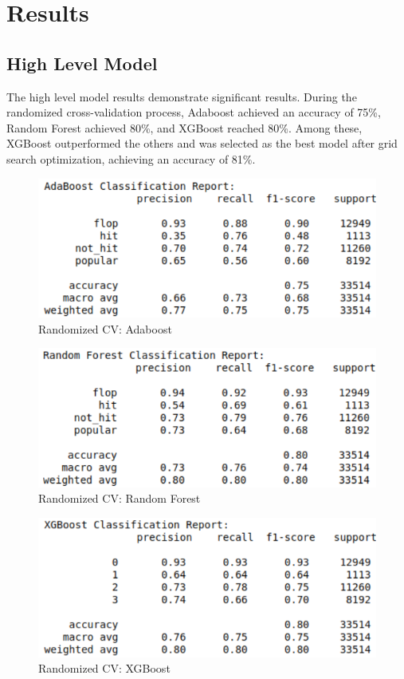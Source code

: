 \documentclass[11pt]{report}
\begin{document}

\chapter{Results}

\section{High Level Model}

The high level model results demonstrate significant results. During the randomized cross-validation process, Adaboost achieved an accuracy of 75\%, Random Forest achieved 80\%, and XGBoost reached 80\%. Among these, XGBoost outperformed the others and was selected as the best model after grid search optimization, achieving an accuracy of 81\%.

\begin{figure}[H]
    \centering
    \includegraphics[width=0.8\linewidth]{results/highlevel_ada_random.png}
    \caption{Randomized CV: Adaboost}
\end{figure}

\begin{figure}[H]
    \centering
    \includegraphics[width=0.8\linewidth]{results/highlevel_rf_random.png}
    \caption{Randomized CV: Random Forest}
\end{figure}

\begin{figure}[H]
    \centering
    \includegraphics[width=0.8\linewidth]{results/highlevel_xgb_random.png}
    \caption{Randomized CV: XGBoost}
\end{figure}
\end{document}
